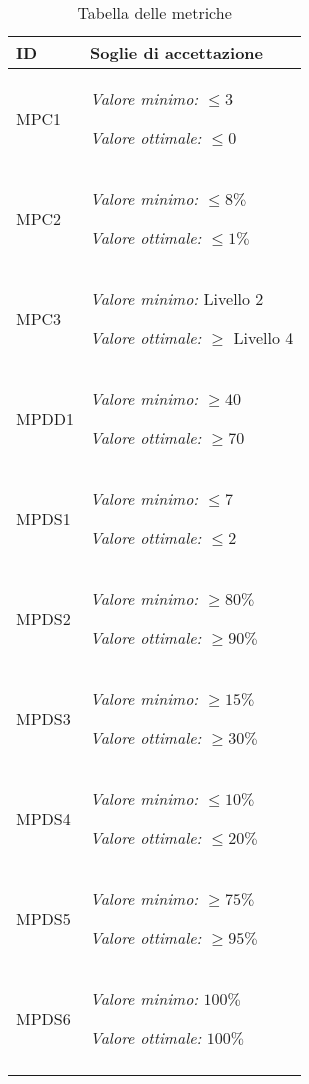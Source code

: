 			\begin{center}
			\begin{longtable}{ | >{\centering\arraybackslash}m{3.5cm} 
							   | >{\raggedright\arraybackslash}m{6cm} | }
        
        	\hline
        		\textbf{ID} & \textbf{Soglie di accettazione} \\ \hline
        	\endhead
			        
				MPC1 &  
						\textit{Valore minimo:} $\leq 3$\par
						\textit{Valore ottimale:} $\leq 0$\\ 
						\hline
			        											
			    MPC2 & 
			    		\textit{Valore minimo:} $\leq 8\%$\par
						\textit{Valore ottimale:} $\leq 1\%$\\ 
						\hline
			      															
				MPC3 & 
						\textit{Valore minimo:} Livello 2\par
						\textit{Valore ottimale:} $\geq$ Livello 4\\ 
						\hline

				MPDD1 &
						\textit{Valore minimo:} $\geq 40$\par
						\textit{Valore ottimale:} $\geq 70$\\ 
						\hline

			    MPDS1 &  
			    		\textit{Valore minimo:} $\leq 7$\par
						\textit{Valore ottimale:} $\leq 2$\\ 
						\hline

			    MPDS2 & 
			    		\textit{Valore minimo:} $\geq 80\%$\par
			        	\textit{Valore ottimale:} $\geq 90\%$\\ 
			        	\hline

			    MPDS3 &	
			    		\textit{Valore minimo:} $\geq 15\%$\par  
						\textit{Valore ottimale:} $\geq 30\%$\\ 
						\hline

			    MPDS4 & 
			    		\textit{Valore minimo:} $\leq 10\%$\par
			        	\textit{Valore ottimale:} $\leq 20\%$\\ 
			        	\hline

				MPDS5 &
						\textit{Valore minimo:} $\geq 75\%$\par 
						\textit{Valore ottimale:} $\geq 95\%$
						\\ \hline

				MPDS6 &
						\textit{Valore minimo:} $100\%$\par 
						\textit{Valore ottimale:} $100\%$
						\\ \hline
			\caption[Tabella delle metriche]{Tabella delle metriche}										
			\end{longtable}
			\end{center}\\

